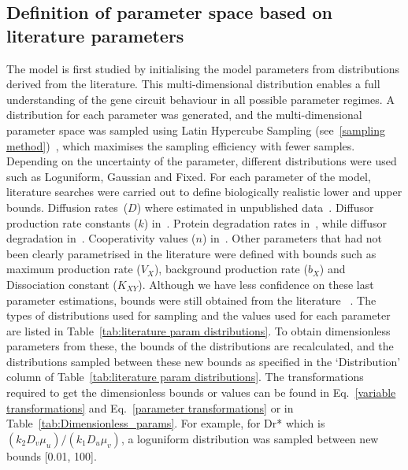 \subsection{Definition of parameter space based on literature parameters}\label{Definition of parameter space based on literature parametrisation}
The model is first studied by initialising the model parameters from distributions derived from the literature.
This multi-dimensional distribution enables a full understanding of the gene circuit behaviour in all possible parameter regimes.
A distribution for each parameter was generated,
and the multi-dimensional parameter space was sampled using Latin Hypercube Sampling
(see~\ref{sampling method})~\parencite{Iman2014, Bergstra2012},
which maximises the sampling efficiency with fewer samples.
Depending on the uncertainty of the parameter, different distributions were used such as Loguniform, Gaussian and Fixed.
 For each parameter of the model,
literature searches were carried out to define biologically realistic lower and upper bounds.
Diffusion rates~($D$) where estimated in unpublished data~\parencite{tica_diffusers}.
Diffusor production rate constants ($k$) in~\cite{Schaefer1996, Pai2009}.
Protein degradation rates in~\cite{Andersen1998}, while diffusor degradation in~\cite{kaufmann2005revisiting}.
Cooperativity values ($n$) in~\cite{Babic2007}.
Other parameters that had not been clearly parametrised in the literature were defined with bounds such as maximum production rate
($V_{X}$),
background production rate ($b_{X}$) and Dissociation constant
($K_{XY}$).
Although we have less confidence on these last parameter estimations,
bounds were still obtained from the literature ~\parencite{Scholes2019, Pusnik2019}.
The types of distributions
used for sampling and the values used for each parameter are listed in Table~\ref{tab:literature param distributions}.
To obtain dimensionless parameters from these, the bounds of the distributions are recalculated,
and the distributions sampled between these new bounds as specified in the ‘Distribution’
column of Table~\ref{tab:literature param distributions}.
The transformations
required to get the dimensionless bounds or values can be found in Eq.~\ref{variable transformations} and Eq.~\ref{parameter transformations} or in Table~\ref{tab:Dimensionless_params}.
For example, for Dr* which is $(k_{2}D_{v}\mu_{u})/(k_{1}D_{u}\mu_{v})$,
a loguniform distribution was sampled between new bounds [0.01, 100].
